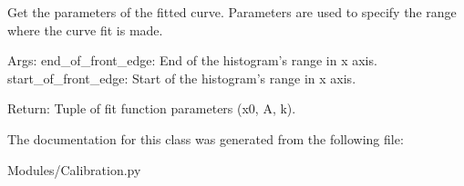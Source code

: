 \begin{DoxyVerb}Get the parameters of the fitted curve. Parameters are used to specify 
the range where the curve fit is made.

Args:
    end_of_front_edge: End of the histogram's range in x axis.
    start_of_front_edge: Start of the histogram's range in x axis.

Return: 
    Tuple of fit function parameters (x0, A, k).
\end{DoxyVerb}
 

The documentation for this class was generated from the following file\-:\begin{DoxyCompactItemize}
\item 
Modules/Calibration.\-py\end{DoxyCompactItemize}
